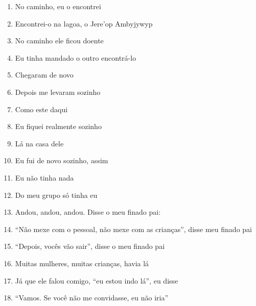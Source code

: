 \begin{enumerate}
 \begin{center}\end{center}

 \item No caminho, eu o encontrei

 \item Encontrei-o na lagoa, o Jere'op Ambyjywyp

 \item No caminho ele ficou doente

 \item Eu tinha mandado o outro encontrá-lo

 \item Chegaram de novo

 \item Depois me levaram sozinho

 \item Como este daqui

 \item Eu fiquei realmente sozinho

 \item Lá na casa dele

 \item Eu fui de novo sozinho, assim

 \item Eu não tinha nada

 \item Do meu grupo só tinha eu

 \begin{center}\end{center}

 \item Andou, andou, andou. Disse o meu finado pai:

 \item ``Não mexe com o pessoal, não mexe com as crianças'', disse meu finado pai

 \item ``Depois, vocês vão sair'', disse o meu finado pai

 \item Muitas mulheres, muitas crianças, havia lá

 \item Já que ele falou comigo, ``eu estou indo lá'', eu disse

 \item ``Vamos. Se você não me convidasse, eu não iria''

 \begin{center}\end{center}


\end{enumerate}

